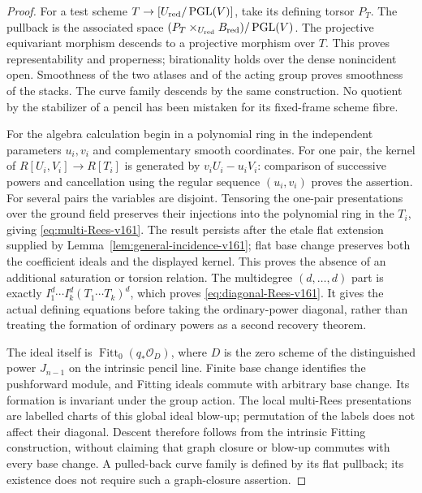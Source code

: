 \documentclass[11pt,reqno]{amsart}
\numberwithin{equation}{section}
\theoremstyle{definition}\newtheorem{definition}[theorem]{Definition}
\theoremstyle{remark}\newtheorem{remark}[theorem]{Remark}
\newcommand{\OO}{\mathcal O}\newcommand{\II}{\mathcal I}
\DeclareMathOperator{\Fitt}{Fitt}\DeclareMathOperator{\Ann}{Ann}
\begin{document}
\begin{proof}
For a test scheme $T\to[U_{\rm red}/\operatorname{PGL}(V)]$, take
its defining torsor $P_T$. The pullback is the associated space
$(P_T\times_{U_{\rm red}}B_{\rm red})/\operatorname{PGL}(V)$.
The projective equivariant morphism descends to a projective
morphism over $T$. This proves representability and properness;
birationality holds over the dense nonincident open. Smoothness of
the two atlases and of the acting group proves smoothness of the
stacks. The curve family descends by the same construction. No
quotient by the stabilizer of a pencil has been mistaken for its
fixed-frame scheme fibre.

For the algebra calculation begin in a polynomial ring in the
independent parameters $u_i,v_i$ and complementary smooth
coordinates. For one pair, the kernel of
$R[U_i,V_i]\to R[T_i]$ is generated by $v_iU_i-u_iV_i$:
comparison of successive powers and cancellation using the regular
sequence $(u_i,v_i)$ proves the assertion. For several pairs the
variables are disjoint. Tensoring the one-pair presentations over
the ground field preserves their injections into the polynomial
ring in the $T_i$, giving \eqref{eq:multi-Rees-v161}. The result
persists after the etale flat extension supplied by
Lemma~\ref{lem:general-incidence-v161}; flat base change preserves
both the coefficient ideals and the displayed kernel. This proves
the absence of an additional saturation or torsion relation.
The multidegree $(d,\ldots,d)$ part is exactly
$I_1^d\cdots I_k^d(T_1\cdots T_k)^d$, which proves
\eqref{eq:diagonal-Rees-v161}. It gives the actual defining equations
before taking the ordinary-power diagonal, rather than treating the
formation of ordinary powers as a second recovery theorem.

The ideal itself is $\Fitt_0(q_*\OO_D)$, where $D$ is the zero
scheme of the distinguished power $J_{n-1}$ on the intrinsic pencil
line. Finite base change identifies the pushforward module, and
Fitting ideals commute with arbitrary base change. Its formation
is invariant under the group action. The local multi-Rees
presentations are labelled charts of this global ideal blow-up;
permutation of the labels does not affect their diagonal. Descent
therefore follows from the intrinsic Fitting construction, without
claiming that graph closure or blow-up commutes with every base
change. A pulled-back curve family is defined by its flat pullback;
its existence does not require such a graph-closure assertion.
\end{proof}
\end{document}

